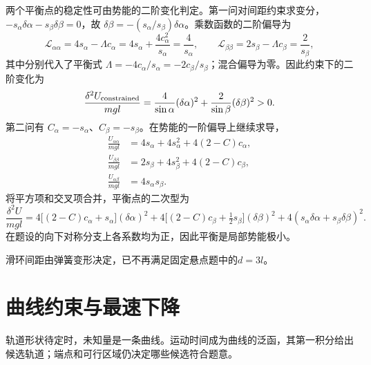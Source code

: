 \begin{solution}
两个平衡点的稳定性可由势能的二阶变化判定。第一问对间距约束求变分，$-s_\alpha\delta\alpha-s_\beta\delta\beta=0$，故 $\delta\beta=-(s_\alpha/s_\beta)\delta\alpha$。乘数函数的二阶偏导为
\[
\mathcal L_{\alpha\alpha}=4s_\alpha-\Lambda c_\alpha
=4s_\alpha+\frac{4c_\alpha^2}{s_\alpha}=\frac4{s_\alpha},
\qquad
\mathcal L_{\beta\beta}=2s_\beta-\Lambda c_\beta=\frac2{s_\beta},
\]
其中分别代入了平衡式 $\Lambda=-4c_\alpha/s_\alpha=-2c_\beta/s_\beta$；混合偏导为零。因此约束下的二阶变化为
\[
 \frac{\delta^2U_{\rm constrained}}{mgl}
 =\frac4{\sin\alpha}(\delta\alpha)^2+
 \frac2{\sin\beta}(\delta\beta)^2>0.
\]
第二问有 $C_\alpha=-s_\alpha$、$C_\beta=-s_\beta$。在势能的一阶偏导上继续求导，
\[
\begin{aligned}
\frac{U_{\alpha\alpha}}{mgl}&=4s_\alpha+4s_\alpha^2+4(2-C)c_\alpha,\\
\frac{U_{\beta\beta}}{mgl}&=2s_\beta+4s_\beta^2+4(2-C)c_\beta,\\
\frac{U_{\alpha\beta}}{mgl}&=4s_\alpha s_\beta.
\end{aligned}
\]
将平方项和交叉项合并，平衡点的二次型为
\[
 \frac{\delta^2U}{mgl}=
 4\bigl[(2-C)c_\alpha+ s_\alpha\bigr](\delta\alpha)^2
 +4\bigl[(2-C)c_\beta+\tfrac12s_\beta\bigr](\delta\beta)^2
 +4(s_\alpha\delta\alpha+s_\beta\delta\beta)^2.
\]
在题设的向下对称分支上各系数均为正，因此平衡是局部势能极小。

滑环间距由弹簧变形决定，已不再满足固定悬点题中的$d=3l$。


\end{solution}



\section{曲线约束与最速下降}

轨道形状待定时，未知量是一条曲线。运动时间成为曲线的泛函，其第一积分给出候选轨道；端点和可行区域仍决定哪些候选符合题意。



